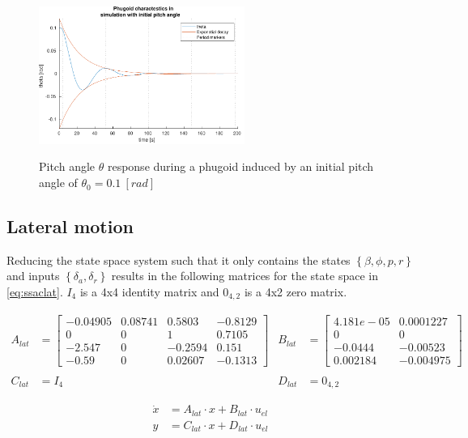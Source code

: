 \begin{figure}[ht]
    \centering
    \includegraphics[width=0.6\textwidth]{figures/ol_ph}
    \label{fig:ol_ph}
    \caption{Pitch angle $\theta$ response during a phugoid induced by an initial pitch angle of $\theta_0=0.1\ [rad]$}
\end{figure}

\subsection{Lateral motion}
Reducing the state space system such that it only contains the states $\left \{ \beta, \phi, p, r \right \}$ and inputs $\left \{ \delta_{a}, \delta_{r} \right \}$ results in the following matrices for the state space in \autoref{eq:ssaclat}. $I_4$ is a 4x4 identity matrix and $0_{4,2}$ is a 4x2 zero matrix.


\begin{align*}
    A_{lat}&=\begin{bmatrix}
        -0.04905 & 0.08741 &  0.5803 & -0.8129 \\
               0 &       0 &       1 &  0.7105 \\
          -2.547 &       0 & -0.2594 &   0.151 \\
           -0.59 &       0 & 0.02607 & -0.1313
    \end{bmatrix} &
    B_{lat}&=\begin{bmatrix}
        4.181e-05 & 0.0001227 \\
                0 &         0 \\
          -0.0444 &  -0.00523 \\
         0.002184 & -0.004975 
    \end{bmatrix} \\\\
    C_{lat}&=I_4 &
    D_{lat}&=0_{4,2}
\end{align*}

\begin{align}    
    \dot{x} &= A_{lat} \cdot x + B_{lat} \cdot u_{el} \nonumber\\
    y &= C_{lat} \cdot x + D_{lat} \cdot u_{el} \label{eq:ssaclat}
\end{align}

